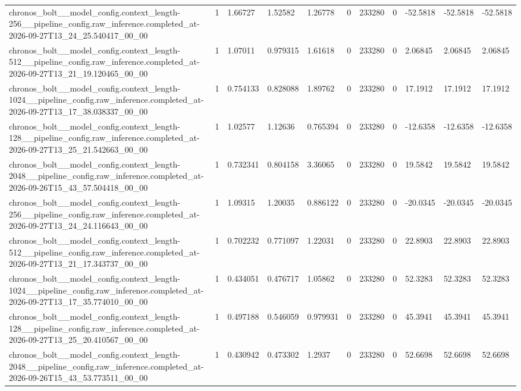 \begin{tabular}{lllllllllll}
chronos\_bolt\_\_model\_config.context\_length-256\_\_pipeline\_config.raw\_inference.completed\_at-2026-09-27T13\_24\_25.540417\_00\_00 & 1 & 1.66727 & 1.52582 & 1.26778 & 0 & 233280 & 0 & -52.5818 & -52.5818 & -52.5818 \\
chronos\_bolt\_\_model\_config.context\_length-512\_\_pipeline\_config.raw\_inference.completed\_at-2026-09-27T13\_21\_19.120465\_00\_00 & 1 & 1.07011 & 0.979315 & 1.61618 & 0 & 233280 & 0 & 2.06845 & 2.06845 & 2.06845 \\
chronos\_bolt\_\_model\_config.context\_length-1024\_\_pipeline\_config.raw\_inference.completed\_at-2026-09-27T13\_17\_38.038337\_00\_00 & 1 & 0.754133 & 0.828088 & 1.89762 & 0 & 233280 & 0 & 17.1912 & 17.1912 & 17.1912 \\
chronos\_bolt\_\_model\_config.context\_length-128\_\_pipeline\_config.raw\_inference.completed\_at-2026-09-27T13\_25\_21.542663\_00\_00 & 1 & 1.02577 & 1.12636 & 0.765394 & 0 & 233280 & 0 & -12.6358 & -12.6358 & -12.6358 \\
chronos\_bolt\_\_model\_config.context\_length-2048\_\_pipeline\_config.raw\_inference.completed\_at-2026-09-26T15\_43\_57.504418\_00\_00 & 1 & 0.732341 & 0.804158 & 3.36065 & 0 & 233280 & 0 & 19.5842 & 19.5842 & 19.5842 \\
chronos\_bolt\_\_model\_config.context\_length-256\_\_pipeline\_config.raw\_inference.completed\_at-2026-09-27T13\_24\_24.116643\_00\_00 & 1 & 1.09315 & 1.20035 & 0.886122 & 0 & 233280 & 0 & -20.0345 & -20.0345 & -20.0345 \\
chronos\_bolt\_\_model\_config.context\_length-512\_\_pipeline\_config.raw\_inference.completed\_at-2026-09-27T13\_21\_17.343737\_00\_00 & 1 & 0.702232 & 0.771097 & 1.22031 & 0 & 233280 & 0 & 22.8903 & 22.8903 & 22.8903 \\
chronos\_bolt\_\_model\_config.context\_length-1024\_\_pipeline\_config.raw\_inference.completed\_at-2026-09-27T13\_17\_35.774010\_00\_00 & 1 & 0.434051 & 0.476717 & 1.05862 & 0 & 233280 & 0 & 52.3283 & 52.3283 & 52.3283 \\
chronos\_bolt\_\_model\_config.context\_length-128\_\_pipeline\_config.raw\_inference.completed\_at-2026-09-27T13\_25\_20.410567\_00\_00 & 1 & 0.497188 & 0.546059 & 0.979931 & 0 & 233280 & 0 & 45.3941 & 45.3941 & 45.3941 \\
chronos\_bolt\_\_model\_config.context\_length-2048\_\_pipeline\_config.raw\_inference.completed\_at-2026-09-26T15\_43\_53.773511\_00\_00 & 1 & 0.430942 & 0.473302 & 1.2937 & 0 & 233280 & 0 & 52.6698 & 52.6698 & 52.6698 \\

\end{tabular}
